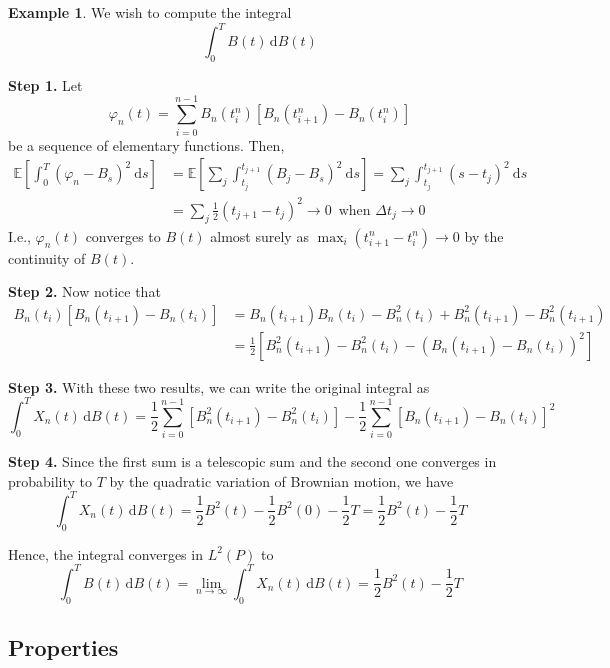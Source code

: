 \documentclass[12pt,a4paper]{article}
\theoremstyle{definition}
\newtheorem{example}{Example}[section]
\begin{document}
\begin{example}
	We wish to compute the integral
	\[
		\int_0^T B(t) \, \mathrm{d}B(t)
	\]
	
	\textbf{Step 1.} Let
	\[
		\varphi_n(t) = \sum_{i=0}^{n-1} B_n(t_i^n)[B_n(t_{i+1}^n) - B_n(t_i^n)]
	\]
	be a sequence of elementary functions. Then,
	\begin{equation*}
		\begin{aligned}
			\mathbb{E} \left[ \int_0^T (\varphi_n - B_s)^2 ~\mathrm{d}s \right]
			&= \mathbb{E} \left[ \sum_j \int_{t_j}^{t_{j+1}} (B_j - B_s)^2 ~\mathrm{d}s \right]
			= \sum_j \int_{t_j}^{t_{j+1}} (s - t_j)^2 ~\mathrm{d}s \\
			&= \sum_j \frac{1}{2} \left(t_{j+1} - t_j \right)^2 \longrightarrow 0 \, \text{ when } \Delta t_j \to 0
		\end{aligned}
	\end{equation*}
	I.e., $\varphi_n(t)$ converges to $B(t)$ almost surely as $\max_i (t_{i+1}^n - t_i^n) \to 0$ by the continuity of $B(t)$.
	
	\textbf{Step 2.} Now notice that
	\begin{equation*}
		\begin{aligned}
			B_n(t_i)[B_n(t_{i+1}) - B_n(t_i)] &= B_n(t_{i+1}) B_n(t_i) - B_n^2(t_i) + B_n^2(t_{i+1}) - B_n^2(t_{i+1}) \\
			&= \frac{1}{2} [B_n^2(t_{i+1}) - B_n^2(t_i) - (B_n(t_{i+1}) - B_n(t_i))^2 ]
		\end{aligned}
	\end{equation*}
	
	\textbf{Step 3.} With these two results, we can write the original integral as
	\[
		\int_0^T X_n(t) \, \mathrm{d}B(t) = \frac{1}{2} \sum_{i=0}^{n-1} \left[ B_n^2(t_{i+1}) - B_n^2(t_i) \right] - \frac{1}{2} \sum_{i=0}^{n-1} \left[ B_n(t_{i+1}) - B_n(t_i) \right]^2
	\]
	
	\textbf{Step 4.} Since the first sum is a telescopic sum and the second one converges in probability to $T$ by the quadratic variation of Brownian motion, we have
	\[
		\int_0^T X_n(t) \, \mathrm{d}B(t) = \frac{1}{2} B^2(t) - \frac{1}{2} B^2(0) - \frac{1}{2}T = \frac{1}{2} B^2(t) - \frac{1}{2}T 
	\]
	
	Hence, the integral converges in $L^2(P)$ to
	\[
		\int_0^T B(t) \, \mathrm{d}B(t) = \lim_{n \to \infty} \int_0^T X_n(t) \, \mathrm{d}B(t) = \frac{1}{2} B^2(t) - \frac{1}{2}T 
	\]
\end{example}

\subsection{Properties} %
\end{document}
